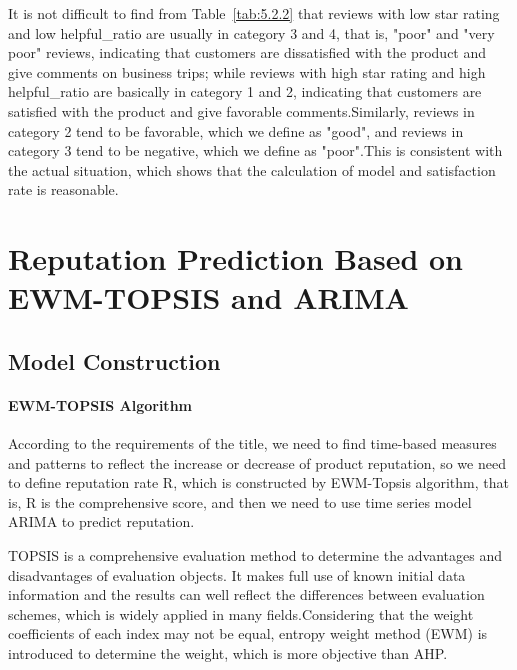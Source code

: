 \documentclass[../mcmpaper]{subfiles}
\begin{document}
    \par
    It is not difficult to find from Table~\ref{tab:5.2.2} that reviews with low star rating and low helpful\_ratio are usually in category 3 and 4, that is, "poor" and "very poor" reviews, indicating that customers are dissatisfied with the product and give comments on business trips; while reviews with high star rating and high helpful\_ratio are basically in category 1 and 2, indicating that customers are satisfied with the product and give favorable comments.Similarly, reviews in category 2 tend to be favorable, which we define as "good", and reviews in category 3 tend to be negative, which we define as "poor".This is consistent with the actual situation, which shows that the calculation of model and satisfaction rate is reasonable.
    \section{Reputation Prediction Based on EWM-TOPSIS and ARIMA}
    \subsection{Model Construction}
    \paragraph{EWM-TOPSIS Algorithm}
    According to the requirements of the title, we need to find time-based measures and patterns to reflect the increase or decrease of product reputation, so we need to define reputation rate R, which is constructed by EWM-Topsis algorithm, that is, R is the comprehensive score, and then we need to use time series model ARIMA to predict reputation.
    \par
    TOPSIS\cite{5} is a comprehensive evaluation method to determine the advantages and disadvantages of evaluation objects. It makes full use of known initial data information and the results can well reflect the differences between evaluation schemes, which is widely applied in many fields.Considering that the weight coefficients of each index may not be equal, entropy weight method (EWM) is introduced to determine the weight, which is more objective than AHP.
\end{document}
